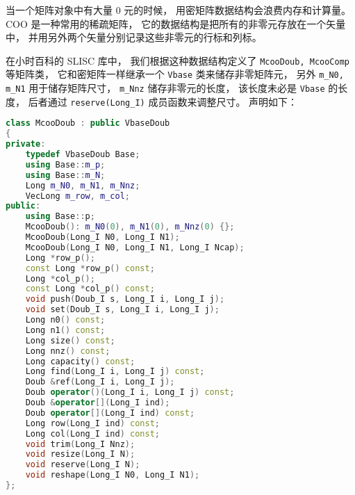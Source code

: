 
\begin{issues}
\issueDraft
\end{issues}


当一个矩阵对象中有大量 0 元的时候， 用密矩阵数据结构会浪费内存和计算量。 COO 是一种常用的稀疏矩阵， 它的数据结构是把所有的非零元存放在一个矢量中， 并用另外两个矢量分别记录这些非零元的行标和列标。

在小时百科的 SLISC 库中， 我们根据这种数据结构定义了 \verb|McooDoub, McooComp| 等矩阵类， 它和密矩阵一样继承一个 \verb|Vbase| 类来储存非零矩阵元， 另外 \verb|m_N0, m_N1| 用于储存矩阵尺寸， \verb|m_Nnz| 储存非零元的长度， 该长度未必是 \verb|Vbase| 的长度， 后者通过 \verb|reserve(Long_I)| 成员函数来调整尺寸。 声明如下：
\begin{lstlisting}[language=cpp]
class McooDoub : public VbaseDoub
{
private:
    typedef VbaseDoub Base;
    using Base::m_p;
    using Base::m_N;
    Long m_N0, m_N1, m_Nnz;
    VecLong m_row, m_col;
public:
    using Base::p;
    McooDoub(): m_N0(0), m_N1(0), m_Nnz(0) {};
    McooDoub(Long_I N0, Long_I N1);
    McooDoub(Long_I N0, Long_I N1, Long_I Ncap);
    Long *row_p();
    const Long *row_p() const;
    Long *col_p();
    const Long *col_p() const;
    void push(Doub_I s, Long_I i, Long_I j);
    void set(Doub_I s, Long_I i, Long_I j);
    Long n0() const;
    Long n1() const;
    Long size() const;
    Long nnz() const;
    Long capacity() const;
    Long find(Long_I i, Long_I j) const;
    Doub &ref(Long_I i, Long_I j);
    Doub operator()(Long_I i, Long_I j) const;
    Doub &operator[](Long_I ind);
    Doub operator[](Long_I ind) const;
    Long row(Long_I ind) const;
    Long col(Long_I ind) const;
    void trim(Long_I Nnz);
    void resize(Long_I N);
    void reserve(Long_I N);
    void reshape(Long_I N0, Long_I N1);
};
\end{lstlisting}
